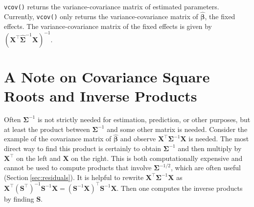\documentclass{article}
\begin{document}
\texttt{vcov()} returns the variance-covariance matrix of estimated
parameters. Currently, \texttt{vcov()} only returns the
variance-covariance matrix of \(\hat{\boldsymbol{\beta}}\), the fixed
effects. The variance-covariance matrix of the fixed effects is given by
\((\mathbf{X}^\top \hat{\boldsymbol{\Sigma}}^{-1} \mathbf{X})^{-1}\).

\hypertarget{sec:iprod}{%
\section{A Note on Covariance Square Roots and Inverse
Products}\label{sec:iprod}}

Often \(\boldsymbol{\Sigma}^{-1}\) is not strictly needed for
estimation, prediction, or other purposes, but at least the product
between \(\boldsymbol{\Sigma}^{-1}\) and some other matrix is needed.
Consider the example of the covariance matrix of
\(\hat{\boldsymbol{\beta}}\) and observe
\(\mathbf{X}^\top \boldsymbol{\Sigma}^{-1} \mathbf{X}\) is needed. The
most direct way to find this product is certainly to obtain
\(\boldsymbol{\Sigma}^{-1}\) and then multiply by \(\mathbf{X}^\top\) on
the left and \(\mathbf{X}\) on the right. This is both computationally
expensive and cannot be used to compute products that involve
\(\boldsymbol{\Sigma}^{-1/2}\), which are often useful
(Section\(~\)\ref{sec:residuals}). It is helpful to rewrite
\(\mathbf{X}^\top \boldsymbol{\Sigma}^{-1} \mathbf{X}\) as
\(\mathbf{X}^\top (\mathbf{S}^\top)^{-1} \mathbf{S}^{-1} \mathbf{X} = (\mathbf{S}^{-1} \mathbf{X})^\top \mathbf{S}^{-1} \mathbf{X}\).
Then one computes the inverse products by finding \(\mathbf{S}\).
\end{document}
